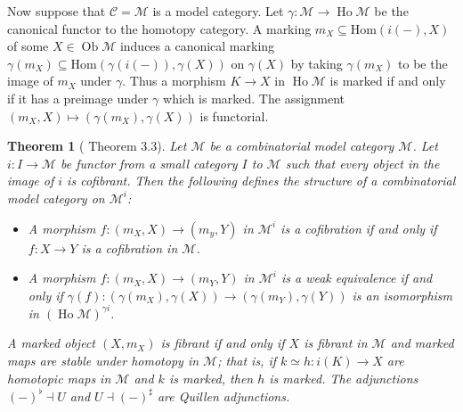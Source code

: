\documentclass[a4paper]{article}
\newtheorem{theorem}{Theorem}
\theoremstyle{remark}
\theoremstyle{definition}
\begin{document}
Now suppose that $\mathcal{C} = \mathcal{M}$ is a model category.
Let $\gamma : \mathcal{M} \rightarrow \operatorname{Ho} \mathcal{M}$ be the canonical functor to the homotopy category.
A marking $m_X \subseteq \mathrm{Hom}(i(-), X)$ of some $X \in \operatorname{Ob} \mathcal{M}$ induces a canonical marking $\gamma(m_X) \subseteq \mathrm{Hom}(\gamma(i(-)), \gamma(X))$ on $\gamma(X)$ by taking $\gamma(m_X)$ to be the image of $m_X$ under $\gamma$.
Thus a morphism $K \rightarrow X$ in $\operatorname{Ho} \mathcal{M}$ is marked if and only if it has a preimage under $\gamma$ which is marked.
The assignment $(m_X, X) \mapsto (\gamma(m_X), \gamma(X))$ is functorial.

\begin{theorem}[\cite{marked-objects} Theorem 3.3]
  \label{th:marked-model-category}
  Let $\mathcal{M}$ be a combinatorial model category $\mathcal{M}$.
  Let $i : I \rightarrow \mathcal{M}$ be functor from a small category $I$ to $\mathcal{M}$ such that every object in the image of $i$ is cofibrant.
  Then the following defines the structure of a combinatorial model category on $\mathcal{M}^i$:
  \begin{itemize}
    \item
      A morphism $f : (m_X, X) \rightarrow (m_y, Y)$ in $\mathcal{M}^i$ is a cofibration if and only if $f : X \rightarrow Y$ is a cofibration in $\mathcal{M}$.
    \item
      A morphism $f : (m_X, X) \rightarrow (m_Y, Y)$ in $\mathcal{M}^i$ is a weak equivalence if and only if $\gamma(f) : (\gamma(m_X), \gamma(X)) \rightarrow (\gamma(m_Y), \gamma(Y))$ is an isomorphism in $(\operatorname{Ho} \mathcal{M})^{\gamma i}$.
  \end{itemize}
  A marked object $(X, m_X)$ is fibrant if and only if $X$ is fibrant in $\mathcal{M}$ and marked maps are stable under homotopy in $\mathcal{M}$; that is, if $k \simeq h : i(K) \rightarrow X$ are homotopic maps in $\mathcal{M}$ and $k$ is marked, then $h$ is marked.
  The adjunctions $(-)^\flat \dashv U$ and $U \dashv (-)^\sharp$ are Quillen adjunctions.
\end{theorem}
\end{document}
